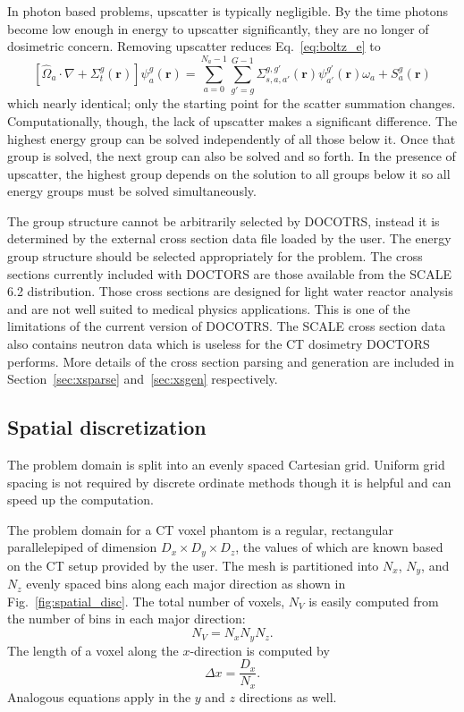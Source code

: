 In photon based problems, upscatter is typically negligible. By the time photons become low enough in energy to upscatter significantly, they are no longer of dosimetric concern. Removing upscatter reduces Eq.~\ref{eq:boltz_e} to
\begin{equation} \label{eq:boltz_e2}
\left[ \hat{\Omega}_a \cdot \nabla + \Sigma_t^g(\boldsymbol{r}) \right]
\psi_{a}^{g}(\boldsymbol{r}) = 
\sum_{a=0}^{N_a-1} \sum_{g'=g}^{G-1} \Sigma_{s, a, a'}^{g, g'}(\boldsymbol{r}) \psi_{a'}^{g'}(\boldsymbol{r}) \omega_a + S_a^g(\boldsymbol{r})
\end{equation}
which nearly identical; only the starting point for the scatter summation changes. Computationally, though, the lack of upscatter makes a significant difference. The highest energy group can be solved independently of all those below it. Once that group is solved, the next group can also be solved and so forth. In the presence of upscatter, the highest group depends on the solution to all groups below it so all energy groups must be solved simultaneously.

The group structure cannot be arbitrarily selected by DOCOTRS, instead it is determined by the external cross section data file loaded by the user. The energy group structure should be selected appropriately for the problem. The cross sections currently included with DOCTORS are those available from the SCALE 6.2 distribution. Those cross sections are designed for light water reactor analysis and are not well suited to medical physics applications. This is one of the limitations of the current version of DOCOTRS. The SCALE cross section data also contains neutron data which is useless for the CT dosimetry DOCTORS performs. More details of the cross section parsing and generation are included in Section~\ref{sec:xsparse} and~\ref{sec:xsgen} respectively.

\subsection{Spatial discretization}

The problem domain is split into an evenly spaced Cartesian grid. Uniform grid spacing is not required by discrete ordinate methods though it is helpful and can speed up the computation.

The problem domain for a CT voxel phantom is a regular, rectangular parallelepiped of dimension $D_x \times D_y \times D_z$, the values of which are known based on the CT setup provided by the user. The mesh is partitioned into $N_x$, $N_y$, and $N_z$ evenly spaced bins along each major direction as shown in Fig.~\ref{fig:spatial_disc}. The total number of voxels, $N_V$ is easily computed from the number of bins in each major direction:
\begin{equation} \label{eq:n_v}
N_V = N_x N_y N_z.
\end{equation}
The length of a voxel along the $x$-direction is computed by 
\begin{equation} \label{eq:mesh_x}
\Delta x = \frac{D_x}{N_x}.
\end{equation}
Analogous equations apply in the $y$ and $z$ directions as well.

